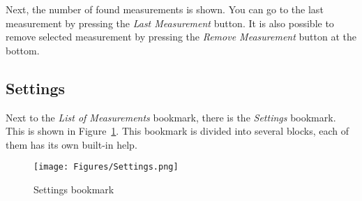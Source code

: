 \documentclass[a4paper,11pt,twoside]{book}
\theoremstyle{named}
\begin{document}
Next, the number of found measurements is shown. You can go to the last
measurement by pressing the \textit{Last Measurement} button. It is also
possible to remove selected measurement by pressing the \textit{Remove
Measurement} button at the bottom.

\subsection{Settings}
\label{sec:Settings}

Next to the \textit{List of Measurements} bookmark, there is the
\textit{Settings} bookmark. This is shown in Figure~\ref{fig:Settings}. This
bookmark is divided into several blocks, each of them has its own built-in help. 

\begin{figure}[t]
  \centering
  \texttt{[image: Figures/Settings.png]}
  \caption{Settings bookmark}
  \label{fig:Settings}
\end{figure}
\end{document}
